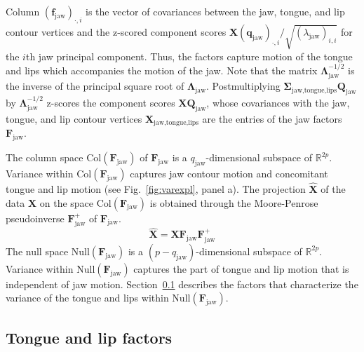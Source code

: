 \documentclass[preprint]{JASAnew}\usepackage[]{graphicx}\usepackage[]{color}
\begin{document}
%
Column $(\mathbf{f}_\text{jaw})_{\cdot,i}$ is the vector of covariances between the jaw, tongue, and lip contour vertices and the z-scored component scores $\mathbf{X} (\mathbf{q}_\text{jaw})_{\cdot,i} / \sqrt{(\lambda_\text{jaw})_{i,i}}$ for the $i$th jaw principal component. 
%
Thus, the factors capture motion of the tongue and lips which accompanies the motion of the jaw. 
%
Note that the matrix $\boldsymbol{\Lambda}_\text{jaw}^{-1/2}$ is the inverse of the principal square root of $\boldsymbol{\Lambda}_\text{jaw}$.
%
Postmultiplying $\boldsymbol{\Sigma}_\text{jaw,tongue,lips} \mathbf{Q}_\text{jaw}$ by $\boldsymbol{\Lambda}_\text{jaw}^{-1/2}$ z-scores the component scores $\mathbf{X}\mathbf{Q}_\text{jaw}$, whose covariances with the jaw, tongue, and lip contour vertices $\mathbf{X}_\text{jaw,tongue,lips}$ are the entries of the jaw factors $\mathbf{F}_\text{jaw}$.

The column space $\mathrm{Col}(\mathbf{F}_\text{jaw})$ of $\mathbf{F}_\text{jaw}$ is a $q_\text{jaw}$-dimensional subspace of $\mathbb{R}^{2p}$. 
%
Variance within $\mathrm{Col}(\mathbf{F}_\text{jaw})$ captures jaw contour motion and concomitant tongue and lip motion (see Fig.~\ref{fig:varexpl}, panel a).
%
The projection $\mathbf{\hat{X}}$ of the data $\mathbf{X}$ on the space $\mathrm{Col}(\mathbf{F}_\text{jaw})$ is obtained through the Moore-Penrose pseudoinverse $\mathbf{F}_\text{jaw}^+$ of $\mathbf{F}_\text{jaw}$. 
%
\begin{equation} \label{eq:XXuu}
\mathbf{\hat{X}} 
= \mathbf{X} 
  \mathbf{F}_\text{jaw}
  \mathbf{F}_\text{jaw}^+ 
\end{equation}
%
The null space $\mathrm{Null}(\mathbf{F}_\text{jaw})$ is a $(p-q_\text{jaw})$-dimensional subspace of $\mathbb{R}^{2p}$. 
% 
Variance within $\mathrm{Null}(\mathbf{F}_\text{jaw})$ captures the part of tongue and lip motion that is independent of jaw motion. 
%
Section~\ref{subsec:residfactors} describes the factors that characterize the variance of the tongue and lips within $\mathrm{Null} \left( \mathbf{F}_\text{jaw} \right)$. 





\subsection{Tongue and lip factors}
\label{subsec:residfactors}
\end{document}

